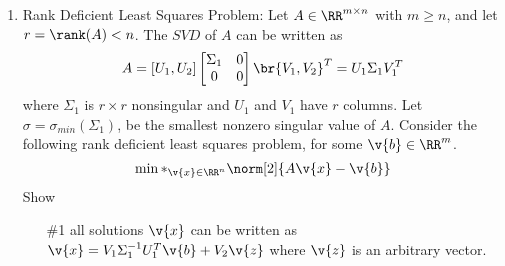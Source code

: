\documentclass[11pt]{article}
\begin{document}
\begin{enumerate}
    \item %
        Rank Deficient Least Squares Problem:
        Let $A \in \RR^{m \times n}$ with $m \ge n$, and let $r = \rank(A) < n$.
        The $SVD$ of $A$ can be written as
        \[
            A = [U_1, U_2]
            \begin{bmatrix}
                \Sigma_1 & 0 \\
                0 & 0
            \end{bmatrix}
            \br{V_1, V_2}^T = U_1 \Sigma_1 V_1^T
        \]
        where $\Sigma_1$ is $r \times r$ nonsingular and $U_1$ and $V_1$ have
        $r$ columns.
        Let $\sigma = \sigma_{min}(\Sigma_1)$, be the smallest nonzero singular
        value of $A$.
        Consider the following rank deficient least squares problem, for some
        $\v{b} \in \RR^m$.
        \[
            \min*_{\v{x} \in \RR^n} \norm[2]{A\v{x} - \v{b}}
        \]
        Show
        \begin{enumerate}
            \item[\#1] %
                all solutions $\v{x}$ can be written as
                $\v{x} = V_1 \Sigma_1^{-1} U_1^T \v{b} + V_2 \v{z}$
                where $\v{z}$ is an arbitrary vector.


\end{enumerate}
\end{enumerate}
\end{document}
